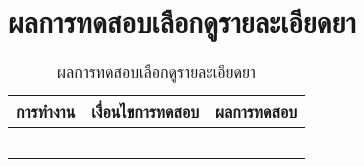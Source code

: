 \section{ผลการทดสอบเลือกดูรายละเอียดยา}
	\begin{table}[H]
		\caption{ผลการทดสอบเลือกดูรายละเอียดยา}
		\centering	
		\label{tab:test3}
		\begin{tabular}{ | p{4.5cm} | p{4.5cm} | p{4.5cm} | }
		\hline
		การทำงาน & เงื่อนไขการทดสอบ & ผลการทดสอบ \\ \hline
		\setstretch{1.0}{เลือกดูรายะละเอียดยา}
		& \setstretch{1.0}{กดบันทึกบุ๊กมาร์กรายการยาที่ยังไม่ถูกบันทึกบุ๊กมาร์ก} 
		& \setstretch{1.0}{แอปพลิเคชันแสดงข้อความ “บันทึกบุ๊กมาร์กสำเร็จแล้ว”} \\ \cline{2-3} 
		& \setstretch{1.0}{กดบันทึกบุ๊กมาร์กรายการยาที่ถูกบันทึกบุ๊กมาร์กแล้ว }
		& \setstretch{1.0}{แอปพลิเคชันแสดงข้อความ “ลบบันทึกบุ๊กมาร์กสำเร็จแล้ว”} \\ \cline{2-3} 
		& \setstretch{1.0}{กดย้อนกลับ }
		& \setstretch{1.0}{แอปพลิเคชันจะแสดงหน้ารายการการค้นหายา} \\ \cline{2-3} 
		& \setstretch{1.0}{กดปุ่ม Home }
		& \setstretch{1.0}{แอปพลิเคชันจะแสดงหน้าค้นหายา} \\ \cline{2-3} 
		& \setstretch{1.0}{กดที่รูปภาพยา }
		& \setstretch{1.0}{แอปพลิเคชันจะแสดงรูปภาพยาแบบขยายใหญ่ขึ้น} \\ \hline
		\end{tabular}
	\end{table}



